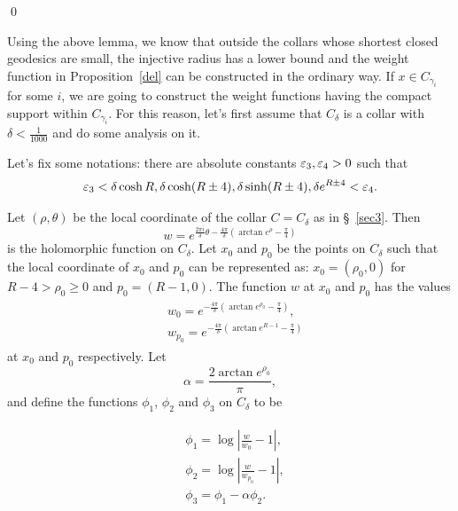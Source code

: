 \qed




Using the above lemma, we know that outside the collars whose shortest
closed geodesics are small, the injective radius has a lower bound and
the weight function in Proposition~\ref{del} can be constructed in the
ordinary way.
If $x\in C_{\gamma_i}$ for some $i$, we are going to construct the  weight
functions having the compact support within $C_{\gamma_i}$. For this
reason, let's first assume that $C_\delta$ is a collar with 
$\delta<\frac{1}{1000}$ and do some analysis on it.

Let's fix some notations:
there are
absolute constants $\varepsilon_3, \varepsilon_4>0$ such that
\begin{equation}\label{eps2}
\varepsilon_3<\delta\cosh R, \delta\cosh(R\pm 4),\delta\sinh (R\pm 4),
\delta e^{R\pm 4}<\varepsilon_4.
\end{equation}

Let $(\rho,\theta)$ be the local coordinate of the collar
$C=C_\delta$ as in \S ~\ref{sec3}. Then
\begin{equation}\label{3-defw}
w=e^{\frac{2\pi i}{\delta}\theta-\frac{4\pi}{\delta}(\arctan
e^\rho-\frac\pi 4)}
\end{equation}
is the holomorphic function on $C_\delta$.
Let $x_0$ and $p_0$ be the points on $C_\delta$ such that
the local coordinate of $x_0$ and $p_0$ can be represented as:
 $x_0=(\rho_0,0)$ for $R-4>\rho_0\geq 0$ and
$p_0=(R-1,0)$. The function $w$ at $x_0$ and $p_0$
has the values
\begin{align}\label{3-defw0}
\begin{split}
&w_0=e^{-\frac{4\pi}{\delta}(\arctan e^{\rho_0}-\frac\pi 4)},\\
& w_{p_0}=e^{-\frac{4\pi}{\delta}(\arctan e^{R-1}-\frac\pi 4)}
\end{split}
\end{align}
at $x_0$ and $p_0$ respectively.
Let
\begin{equation}\label{alpha}
\alpha=\frac{2\arctan e^{\rho_0}}{\pi},
\end{equation}
and define the functions $\phi_1$, $\phi_2$ and $\phi_3$ 
on $C_\delta$ 
to be

\begin{align}\label{defphi}
\begin{split}
&\phi_1=\log |\frac{w}{w_0}-1|,\\
&\phi_2=\log |\frac{w}{w_{p_0}}-1|,\\
&\phi_3=\phi_1-\alpha\phi_2.
\end{split}
\end{align}


